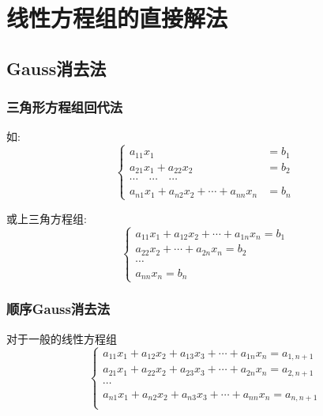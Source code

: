 \chapter{线性方程组的直接解法}

\section{Gauss消去法}

\subsection{三角形方程组回代法}

如:
\begin{equation*}
    \begin{cases}
        a_{11}x_1&=b_1\\
        a_{21}x_1+a_{22}x_2&=b_2\\
        \cdots\quad\cdots\quad\cdots\\
        a_{n1}x_1+a_{n2}x_2+\cdots+a_{nn}x_n&=b_n
    \end{cases}
\end{equation*}

或上三角方程组:
\begin{equation*}
    \left\{
    \begin{aligned}
        a_{11}x_1+a_{12}x_2+\cdots+a_{1n}x_n=b_1\\
        a_{22}x_2+\cdots+a_{2n}x_n=b_2\\
        \cdots\qquad\qquad\qquad\\
        a_{nn}x_n=b_n
    \end{aligned}
    \right.
\end{equation*}

\subsection{顺序Gauss消去法}

对于一般的线性方程组
\begin{equation*}
    \begin{cases}
        a_{11}x_1+a_{12}x_2+a_{13}x_3+\cdots+a_{1n}x_n=a_{1,n+1}\\
        a_{21}x_1+a_{22}x_2+a_{23}x_3+\cdots+a_{2n}x_n=a_{2,n+1}\\
        \cdots\\
        a_{n1}x_1+a_{n2}x_2+a_{n3}x_3+\cdots+a_{nn}x_n=a_{n,n+1}\\
    \end{cases}
\end{equation*}

